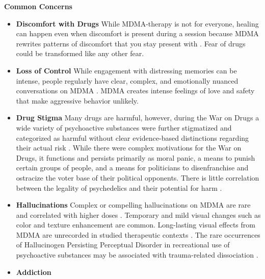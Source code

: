 \documentclass[12pt,letterpaper]{article}
\begin{document}
\noindent \textbf{Common Concerns}
\begin{itemize}
    \item \textbf{Discomfort with Drugs}
     While MDMA-therapy is not for everyone, healing can happen even when discomfort is present during a session because MDMA rewrites patterns of discomfort that you stay present with \cite{fedduciaMDMAMemoryReconsolidation}. Fear of drugs could be transformed like any other fear.
    \item \textbf{Loss of Control}    
        While engagement with distressing memories can be intense, people regularly have clear, complex, and emotionally nuanced conversations on MDMA \cite{colbertEvenings,passieHistory}. MDMA creates intense feelings of love and safety that make aggressive behavior unlikely.
    \item \textbf{Drug Stigma}
        Many drugs are harmful, however, during the War on Drugs a wide variety of psychoactive substances were further stigmatized and categorized as harmful without clear evidence-based distinctions regarding their actual risk \cite{alexanderNewJimCrow,nuttDrugHarms}. While there were complex motivations for the War on Drugs, it functions and persists primarily as moral panic, a means to punish certain groups of people, and a means for politicians to disenfranchise and ostracize the voter base of their political opponents. There is little correlation between the legality of psychedelics and their potential for harm \cite{nuttDrugHarms}.
    \item \textbf{Hallucinations}
        Complex or compelling hallucinations on MDMA are rare and correlated with higher doses \cite{liechtiGender}. Temporary and mild visual changes such as color and texture enhancement are common. Long-lasting visual effects from MDMA are unrecorded in studied therapeutic contexts \cite{vizeliActuteEffects}. The rare occurrences of Hallucinogen Persisting Perceptual Disorder in recreational use of psychoactive substances may be associated with trauma-related dissociation \cite{halpernHPPD}.
    \item \textbf{Addiction}

\end{itemize}
\end{document}
